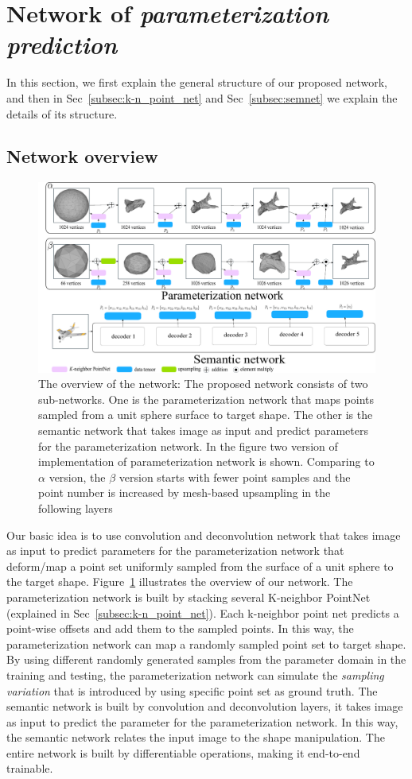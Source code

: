 \section{Network of \emph{parameterization prediction}}
In this section, we first explain the general structure of our proposed network, and then in Sec~\ref{subsec:k-n_point_net} and Sec~\ref{subsec:semnet} we explain the details of its structure.
\subsection{Network overview}
\begin{figure}[htbp]
	\centering
	\includegraphics[width=\linewidth]{img/net/overview}
	\caption{The overview of the network: The proposed network consists of two sub-networks. One is the parameterization network that maps points sampled from a unit sphere surface to target shape. The other is the semantic network that takes image as input and predict parameters for the parameterization network. In the figure two version of implementation of parameterization network is shown. Comparing to $\alpha$ version, the $\beta$ version starts with fewer point samples and the point number is increased by mesh-based upsampling in the following layers}
	\label{fig:overview}
\end{figure}
Our basic idea is to use convolution and deconvolution network that takes image as input to predict parameters for the parameterization network that deform/map a point set uniformly sampled from the surface of a unit sphere to the target shape. Figure~\ref{fig:overview} illustrates the overview of our network. The parameterization network is built by stacking several K-neighbor PointNet (explained in Sec~\ref{subsec:k-n_point_net}). Each k-neighbor point net predicts a point-wise offsets and add them to the sampled points. In this way, the parameterization network can map a randomly sampled point set to target shape. By using different randomly generated samples from the parameter domain in the training and testing, the parameterization network can simulate the \textit{sampling variation} that is introduced by using specific point set as ground truth. The semantic network is built by convolution and deconvolution layers, it takes image as input to predict the parameter for the parameterization network. In this way, the semantic network relates the input image to the shape manipulation. The entire network is built by differentiable operations, making it end-to-end trainable.
